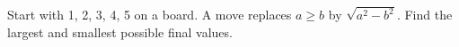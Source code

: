 Start with 1, 2, 3, 4, 5 on a board. A move replaces $ a\ge b $ by $\sqrt{a^2-b^2}$. Find the largest and smallest possible final values.
